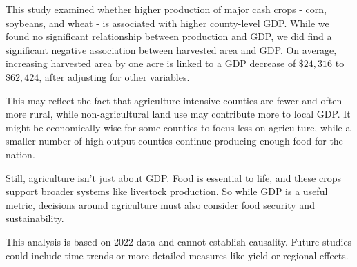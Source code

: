 \documentclass[
  12pt,
]{article}
\begin{document}
This study examined whether higher production of major cash crops -
corn, soybeans, and wheat - is associated with higher county-level GDP.
While we found no significant relationship between production and GDP,
we did find a significant negative association between harvested area
and GDP. On average, increasing harvested area by one acre is linked to
a GDP decrease of \(\$24,316\) to \(\$62,424\), after adjusting for
other variables.

This may reflect the fact that agriculture-intensive counties are fewer
and often more rural, while non-agricultural land use may contribute
more to local GDP. It might be economically wise for some counties to
focus less on agriculture, while a smaller number of high-output
counties continue producing enough food for the nation.

Still, agriculture isn't just about GDP. Food is essential to life, and
these crops support broader systems like livestock production. So while
GDP is a useful metric, decisions around agriculture must also consider
food security and sustainability.

This analysis is based on 2022 data and cannot establish causality.
Future studies could include time trends or more detailed measures like
yield or regional effects.

\printbibliography
\end{document}
